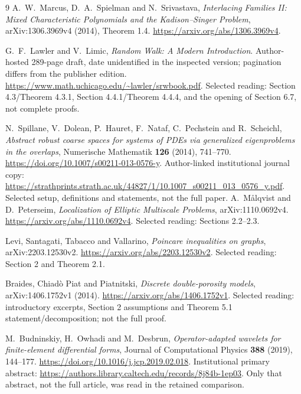 \begin{thebibliography}{9}
A.~W.~Marcus, D.~A.~Spielman and N.~Srivastava,
\emph{Interlacing Families II: Mixed Characteristic Polynomials and the
Kadison--Singer Problem}, arXiv:1306.3969v4 (2014), Theorem 1.4.
\url{https://arxiv.org/abs/1306.3969v4}.

G.~F.~Lawler and V.~Limic, \emph{Random Walk: A Modern Introduction}.
Author-hosted 289-page draft, date unidentified in the inspected version;
pagination differs from the publisher edition.
\url{https://www.math.uchicago.edu/~lawler/srwbook.pdf}.
Selected reading: Section 4.3/Theorem 4.3.1, Section 4.4.1/Theorem 4.4.4,
and the opening of Section 6.7, not complete proofs.

N.~Spillane, V.~Dolean, P.~Hauret, F.~Nataf, C.~Pechstein and R.~Scheichl,
\emph{Abstract robust coarse spaces for systems of PDEs via generalized
eigenproblems in the overlaps}, Numerische Mathematik \textbf{126} (2014),
741--770. \url{https://doi.org/10.1007/s00211-013-0576-y}.
Author-linked institutional journal copy:
\url{https://strathprints.strath.ac.uk/44827/1/10.1007_s00211_013_0576_y.pdf}.
Selected setup, definitions and statements, not the full paper.
A.~M\aa lqvist and D.~Peterseim,
\emph{Localization of Elliptic Multiscale Problems}, arXiv:1110.0692v4.
\url{https://arxiv.org/abs/1110.0692v4}.
Selected reading: Sections 2.2--2.3.

Levi, Santagati, Tabacco and Vallarino,
\emph{Poincare inequalities on graphs}, arXiv:2203.12530v2.
\url{https://arxiv.org/abs/2203.12530v2}.
Selected reading: Section 2 and Theorem 2.1.

Braides, Chiad\`o Piat and Piatnitski,
\emph{Discrete double-porosity models}, arXiv:1406.1752v1 (2014).
\url{https://arxiv.org/abs/1406.1752v1}.
Selected reading: introductory excerpts, Section 2 assumptions and Theorem 5.1 statement/decomposition; not the full proof.

M.~Budninskiy, H.~Owhadi and M.~Desbrun,
\emph{Operator-adapted wavelets for finite-element differential forms},
Journal of Computational Physics \textbf{388} (2019), 144--177.
\url{https://doi.org/10.1016/j.jcp.2019.02.018}.
Institutional primary abstract:
\url{https://authors.library.caltech.edu/records/8j84b-1ep03}.
Only that abstract, not the full article, was read in the retained comparison.
\end{thebibliography}
